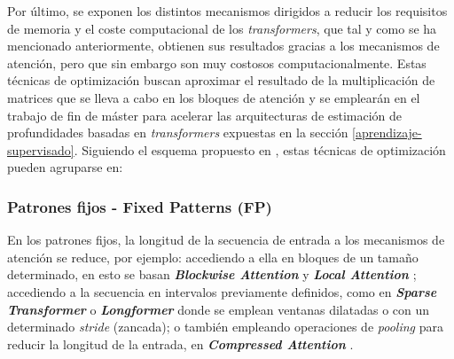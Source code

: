 \documentclass[a4paper]{article}
\newcommand{\textbfit}[1]{\textbf{\textit{#1}}}
\begin{document}

Por último, se exponen los distintos mecanismos dirigidos a reducir los requisitos de memoria y el coste computacional de los \textit{transformers}, que tal y como se ha mencionado anteriormente, obtienen sus resultados gracias a los mecanismos de atención, pero que sin embargo son muy costosos computacionalmente. Estas técnicas de optimización buscan aproximar el resultado de la multiplicación de matrices que se lleva a cabo en los bloques de atención y se emplearán en el trabajo de fin de máster para acelerar las arquitecturas de estimación de profundidades basadas en \textit{transformers} expuestas en la sección \ref{aprendizaje-supervisado}. Siguiendo el esquema propuesto en \cite{2020arXiv200906732T}, estas técnicas de optimización pueden agruparse en:

\subsubsection{Patrones fijos - Fixed Patterns (FP)}
En los patrones fijos, la longitud de la secuencia de entrada a los mecanismos de atención se reduce, por ejemplo: accediendo a ella en bloques de un tamaño determinado, en esto se basan \textbfit{Blockwise Attention} \cite{qiu-etal-2020-blockwise} y \textbfit{Local Attention} \cite{localattention}; accediendo a la secuencia en intervalos previamente definidos, como en \textbfit{Sparse Transformer} \cite{sparse-transformers} o \textbfit{Longformer} \cite{beltagy2020longformer} donde se emplean ventanas dilatadas o con un determinado \textit{stride} (zancada); o también empleando operaciones de \textit{pooling} para reducir la longitud de la entrada, en \textbfit{Compressed Attention} \cite{j.2018generating}.

\end{document}
